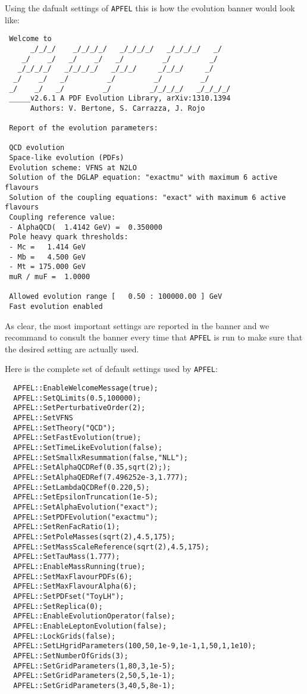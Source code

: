 \documentclass[11pt,a4paper]{article}
\begin{document}
Using the dafualt settings of {\tt APFEL} this is how the evolution
banner would look like:
\begin{lstlisting}
 Welcome to 
      _/_/_/    _/_/_/_/   _/_/_/_/   _/_/_/_/   _/
    _/    _/   _/    _/   _/         _/         _/
   _/_/_/_/   _/_/_/_/   _/_/_/     _/_/_/     _/
  _/    _/   _/         _/         _/         _/
 _/    _/   _/         _/         _/_/_/_/   _/_/_/_/
 _____v2.6.1 A PDF Evolution Library, arXiv:1310.1394
      Authors: V. Bertone, S. Carrazza, J. Rojo
 
 Report of the evolution parameters:
   
 QCD evolution
 Space-like evolution (PDFs)
 Evolution scheme: VFNS at N2LO
 Solution of the DGLAP equation: "exactmu" with maximum 6 active flavours
 Solution of the coupling equations: "exact" with maximum 6 active flavours
 Coupling reference value:
 - AlphaQCD(  1.4142 GeV) =  0.350000
 Pole heavy quark thresholds:
 - Mc =   1.414 GeV
 - Mb =   4.500 GeV
 - Mt = 175.000 GeV
 muR / muF =  1.0000
  
 Allowed evolution range [   0.50 : 100000.00 ] GeV
 Fast evolution enabled
\end{lstlisting}
As clear, the most important settings are reported in the banner and
we recommand to consult the banner every time that {\tt APFEL} is run
to make sure that the desired setting are actually used.

Here is the complete set of default settings used by {\tt APFEL}:
\begin{lstlisting}
  APFEL::EnableWelcomeMessage(true);
  APFEL::SetQLimits(0.5,100000);
  APFEL::SetPerturbativeOrder(2);
  APFEL::SetVFNS
  APFEL::SetTheory("QCD");
  APFEL::SetFastEvolution(true);
  APFEL::SetTimeLikeEvolution(false);
  APFEL::SetSmallxResummation(false,"NLL");
  APFEL::SetAlphaQCDRef(0.35,sqrt(2););
  APFEL::SetAlphaQEDRef(7.496252e-3,1.777);
  APFEL::SetLambdaQCDRef(0.220,5);
  APFEL::SetEpsilonTruncation(1e-5);
  APFEL::SetAlphaEvolution("exact");
  APFEL::SetPDFEvolution("exactmu");
  APFEL::SetRenFacRatio(1);
  APFEL::SetPoleMasses(sqrt(2),4.5,175);
  APFEL::SetMassScaleReference(sqrt(2),4.5,175);
  APFEL::SetTauMass(1.777);
  APFEL::EnableMassRunning(true);
  APFEL::SetMaxFlavourPDFs(6);
  APFEL::SetMaxFlavourAlpha(6);
  APFEL::SetPDFset("ToyLH");
  APFEL::SetReplica(0);
  APFEL::EnableEvolutionOperator(false);
  APFEL::EnableLeptonEvolution(false);
  APFEL::LockGrids(false);
  APFEL::SetLHgridParameters(100,50,1e-9,1e-1,1,50,1,1e10);
  APFEL::SetNumberOfGrids(3);
  APFEL::SetGridParameters(1,80,3,1e-5);
  APFEL::SetGridParameters(2,50,5,1e-1);
  APFEL::SetGridParameters(3,40,5,8e-1);
\end{lstlisting}
\end{document}
